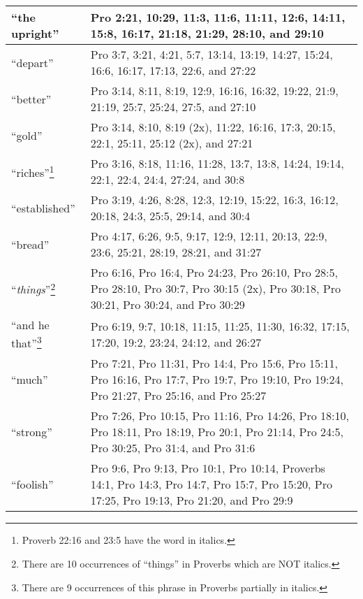 \begin{center}
\begin{longtable}{l|p{3.75in}}
``the upright'' & Pro 2:21, 10:29, 11:3, 11:6, 11:11, 12:6, 14:11, 15:8, 16:17, 21:18, 21:29, 28:10, and 29:10 \\ \hline

``depart'' & Pro 3:7, 3:21, 4:21, 5:7, 13:14, 13:19, 14:27, 15:24, 16:6, 16:17, 17:13, 22:6, and 27:22 \\ \hline

``better'' & Pro 3:14, 8:11, 8:19, 12:9, 16:16, 16:32, 19:22, 21:9, 21:19, 25:7, 25:24, 27:5, and 27:10  \\ \hline

``gold'' & Pro 3:14, 8:10, 8:19 (2x), 11:22, 16:16, 17:3, 20:15, 22:1, 25:11, 25:12 (2x), and 27:21 
 \\ \hline
 
``riches''\footnote{Proverb 22:16 and 23:5 have the word in italics.} & Pro 3:16, 8:18, 11:16, 11:28, 13:7, 13:8, 14:24, 19:14, 22:1, 22:4, 24:4, 27:24, and 30:8 \\ \hline
 
``established'' & Pro 3:19, 4:26, 8:28, 12:3, 12:19, 15:22, 16:3, 16:12, 20:18, 24:3, 25:5, 29:14, and 30:4  \\ \hline
 
``bread'' & Pro 4:17, 6:26, 9:5, 9:17, 12:9, 12:11, 20:13, 22:9, 23:6, 25:21, 28:19, 28:21, and 31:27  \\ \hline

 
``\emph{things}''\footnote{There are 10 occurrences of ``things'' in Proverbs which are NOT italics. } & Pro 6:16, Pro 16:4, Pro 24:23, Pro 26:10, Pro 28:5, Pro 28:10, Pro 30:7, Pro 30:15 (2x), Pro 30:18, Pro 30:21, Pro 30:24, and Pro 30:29 \\ \hline
 
``and he that''\footnote{There are 9 occurrences of this phrase in Proverbs partially in italics.} & Pro 6:19, 9:7, 10:18, 11:15, 11:25, 11:30, 16:32, 17:15, 17:20, 19:2, 23:24, 24:12, and 26:27 \\ \hline

``much'' & Pro 7:21, Pro 11:31, Pro 14:4, Pro 15:6, Pro 15:11, Pro 16:16, Pro 17:7, Pro 19:7, Pro 19:10, Pro 19:24, Pro 21:27, Pro 25:16, and Pro 25:27 \\ \hline

``strong'' & Pro 7:26, Pro 10:15, Pro 11:16, Pro 14:26, Pro 18:10, Pro 18:11, Pro 18:19, Pro 20:1, Pro 21:14, Pro 24:5, Pro 30:25, Pro 31:4, and Pro 31:6  \\ \hline

``foolish'' & Pro 9:6, Pro 9:13, Pro 10:1, Pro 10:14, Proverbs 14:1, Pro 14:3, Pro 14:7, Pro 15:7, Pro 15:20, Pro 17:25, Pro 19:13, Pro 21:20, and Pro 29:9 \\ \hline


\end{longtable}
\end{center}
